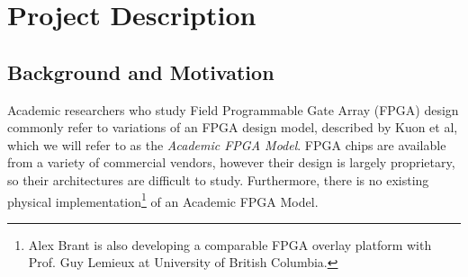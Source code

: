 \section{Project Description}

\subsection{Background and Motivation}

%
%
%

Academic researchers who study Field Programmable Gate Array (FPGA) design commonly refer to variations of an FPGA design model, described by Kuon et al\cite{fpga}, which we will refer to as the \emph{Academic FPGA Model}.
FPGA chips are available from a variety of commercial vendors, however their design is largely proprietary, so their architectures are difficult to study.\citationneeded
Furthermore, there is no existing physical implementation\footnote{Alex Brant is also developing a comparable FPGA overlay platform with Prof. Guy Lemieux at University of British Columbia.} of an Academic FPGA Model.

